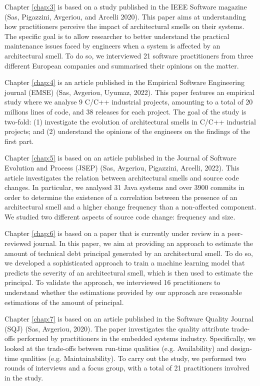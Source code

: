 Chapter \ref{chap:3} is based on a study published in the IEEE Software magazine (Sas, Pigazzini, Avgeriou, and Arcelli 2020).
This paper aims at understanding how practitioners perceive the impact of architectural smells on their systems.
The specific goal is to allow researcher to better understand the practical maintenance issues faced by engineers when a system is affected by an architectural smell.
To do so, we interviewed 21 software practitioners from three different European companies and summarised their opinions on the matter.

Chapter \ref{chap:4} is an article published in the Empirical Software Engineering journal (EMSE) (Sas, Avgeriou, Uyumaz, 2022).
This paper features an empirical study where we analyse 9 C/C++ industrial projects, amounting to a total of 20 millions lines of code, and 38 releases for each project.
The goal of the study is two-fold: (1) investigate the evolution of architectural smells in C/C++ industrial projects; and (2) understand the opinions of the engineers on the findings of the first part.

Chapter \ref{chap:5} is based on an article published in the Journal of Software Evolution and Process (JSEP) (Sas, Avgeriou, Pigazzini, Arcelli, 2022).
This article investigates the relation between architectural smells and source code changes.
In particular, we analysed 31 Java systems and over 3900 commits in order to determine the existence of a correlation between the presence of an architectural smell and a higher change frequency than a non-affected component. 
We studied two different aspects of source code change: frequency and size.

Chapter \ref{chap:6} is based on a paper that is currently under review in a peer-reviewed journal.
In this paper, we aim at providing an approach to estimate the amount of technical debt principal generated by an architectural smell.
To do so, we developed a sophisticated approach to train a machine learning model that predicts the severity of an architectural smell, which is then used to estimate the principal.
To validate the approach, we interviewed 16 practitioners to understand whether the estimations provided by our approach are reasonable estimations of the amount of principal.

Chapter \ref{chap:7} is based on an article published in the Software Quality Journal (SQJ) (Sas, Avgeriou, 2020).
The paper investigates the quality attribute trade-offs performed by practitioners in the embedded systems industry.
Specifically, we looked at the trade-offs between run-time qualities (e.g. Availability) and design-time qualities (e.g. Maintainability).
To carry out the study, we performed two rounds of interviews and a focus group, with a total of 21 practitioners involved in the study.

